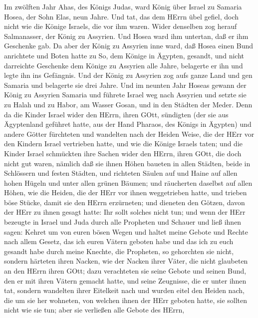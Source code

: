  Im zwölften Jahr Ahas, des Königs Judas, ward König über
Israel zu Samaria Hosea, der Sohn Elas, neun Jahre.  Und
tat, das dem HErrn übel gefiel, doch nicht wie die Könige Israels, die
vor ihm waren.  Wider denselben zog herauf Salmanasser, der
König zu Assyrien. Und Hosea ward ihm untertan, daß er ihm Geschenke
gab.  Da aber der König zu Assyrien inne ward, daß Hosea
einen Bund anrichtete und Boten hatte zu So, dem Könige in Ägypten,
gesandt, und nicht darreichte Geschenke dem Könige zu Assyrien alle
Jahre, belagerte er ihn und legte ihn ins Gefängnis.  Und
der König zu Assyrien zog aufs ganze Land und gen Samaria und belagerte
sie drei Jahre.  Und im neunten Jahr Hoseas gewann der König
zu Assyrien Samaria und führete Israel weg nach Assyrien und setzte sie
zu Halah und zu Habor, am Wasser Gosan, und in den Städten der Meder.
 Denn da die Kinder Israel wider den HErrn, ihren GOtt,
sündigten (der sie aus Ägyptenland geführet hatte, aus der Hand Pharaos,
des Königs in Ägypten) und andere Götter fürchteten  und
wandelten nach der Heiden Weise, die der HErr vor den Kindern Israel
vertrieben hatte, und wie die Könige Israels taten;  und die
Kinder Israel schmückten ihre Sachen wider den HErrn, ihren GOtt, die
doch nicht gut waren, nämlich daß sie ihnen Höhen baueten in allen
Städten, beide in Schlössern und festen Städten,  und
richteten Säulen auf und Haine auf allen hohen Hügeln und unter allen
grünen Bäumen;  und räucherten daselbst auf allen Höhen,
wie die Heiden, die der HErr vor ihnen weggetrieben hatte, und trieben
böse Stücke, damit sie den HErrn erzürneten;  und dieneten
den Götzen, davon der HErr zu ihnen gesagt hatte: Ihr sollt solches
nicht tun;  und wenn der HErr bezeugte in Israel und Juda
durch alle Propheten und Schauer und ließ ihnen sagen: Kehret um von
euren bösen Wegen und haltet meine Gebote und Rechte nach allem Gesetz,
das ich euren Vätern geboten habe und das ich zu euch gesandt habe durch
meine Knechte, die Propheten,  so gehorchten sie nicht,
sondern härteten ihren Nacken, wie der Nacken ihrer Väter, die nicht
glaubeten an den HErrn ihren GOtt;  dazu verachteten sie
seine Gebote und seinen Bund, den er mit ihren Vätern gemacht hatte, und
seine Zeugnisse, die er unter ihnen tat, sondern wandelten ihrer
Eitelkeit nach und wurden eitel den Heiden nach, die um sie her
wohneten, von welchen ihnen der HErr geboten hatte, sie sollten nicht
wie sie tun;  aber sie verließen alle Gebote des HErrn,
